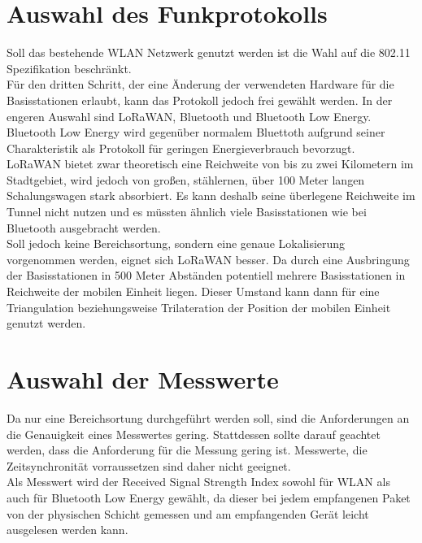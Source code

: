 \section{Auswahl des Funkprotokolls}
Soll das bestehende WLAN Netzwerk genutzt werden ist die Wahl auf die 802.11 Spezifikation beschränkt.\\
Für den dritten Schritt, der eine Änderung der verwendeten Hardware für die Basisstationen erlaubt, kann das Protokoll jedoch frei gewählt werden.
In der engeren Auswahl sind LoRaWAN, Bluetooth und Bluetooth Low Energy.
Bluetooth Low Energy wird gegenüber normalem Bluettoth aufgrund seiner Charakteristik als Protokoll für geringen Energieverbrauch bevorzugt.\\
LoRaWAN bietet zwar theoretisch eine Reichweite von bis zu zwei Kilometern im Stadtgebiet, wird jedoch von großen, stählernen, über 100 Meter langen Schalungswagen stark absorbiert.
Es kann deshalb seine überlegene Reichweite im Tunnel nicht nutzen und es müssten ähnlich viele Basisstationen wie bei Bluetooth ausgebracht werden.\\
Soll jedoch keine Bereichsortung, sondern eine genaue Lokalisierung vorgenommen werden, eignet sich LoRaWAN besser. 
Da durch eine Ausbringung der Basisstationen in 500 Meter Abständen potentiell mehrere Basisstationen in Reichweite der mobilen Einheit liegen.
Dieser Umstand kann dann für eine Triangulation beziehungsweise Trilateration der Position der mobilen Einheit genutzt werden.

\section{Auswahl der Messwerte}
Da nur eine Bereichsortung durchgeführt werden soll, sind die Anforderungen an die Genauigkeit eines Messwertes gering.
Stattdessen sollte darauf geachtet werden, dass die Anforderung für die Messung gering ist.
Messwerte, die Zeitsynchronität vorraussetzen sind daher nicht geeignet.\\
Als Messwert wird der Received Signal Strength Index sowohl für WLAN als auch für Bluetooth Low Energy gewählt, da dieser bei jedem empfangenen Paket von der physischen Schicht gemessen und am empfangenden Gerät leicht ausgelesen werden kann.
